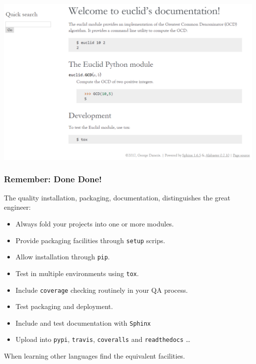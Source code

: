 \documentclass{beamer} %
\begin{document}
\begin{frame}

\begin{center}
\includegraphics[scale=0.5]{assets/docs}
\end{center}

\end{frame}



\begin{frame}

\frametitle{Remember: Done Done!}

The quality installation, packaging, documentation, distinguishes the great engineer:
\begin{itemize}
  \item Always fold your projects into one or more modules.
  \item Provide packaging facilities through \texttt{setup} scrips.
  \item Allow installation through \texttt{pip}.
  \item Test in multiple environments using \texttt{tox}.
  \item Include \texttt{coverage} checking routinely in your QA process.
  \item Test packaging and deployment.
  \item Include and test documentation with \texttt{Sphinx}
  \item Upload into \texttt{pypi}, \texttt{travis}, \texttt{coveralls} and \texttt{readthedocs} \ldots
\end{itemize}

\vspace{3mm}
When learning other languages find the equivalent facilities.

\end{frame}




\end{document}
